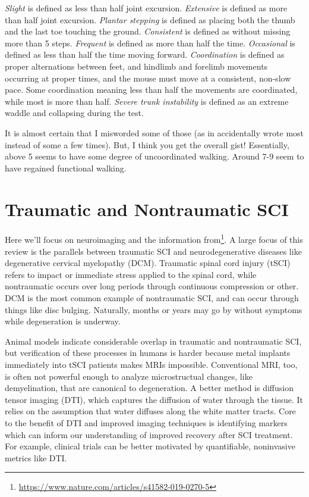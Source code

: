 \textit{Slight} is defined as less than half joint excursion. \textit{Extensive} is defined as more than half joint excursion. \textit{Plantar stepping} is defined as placing both the thumb and the last toe touching the ground. \textit{Consistent} is defined as without missing more than 5 steps. \textit{Frequent} is defined as more than half the time. \textit{Occasional} is defined as less than half the time moving forward. \textit{Coordination} is defined as proper alternations between feet, and hindlimb and forelimb movements occurring at proper times, and the mouse must move at a consistent, non-slow pace. Some coordination meaning less than half the movements are coordinated, while most is more than half. \textit{Severe trunk instability} is defined as an extreme waddle and collapsing during the test.\newline

It is almost certain that I misworded some of those (as in accidentally wrote most instead of some a few times). But, I think you get the overall gist! Essentially, above 5 seems to have some degree of uncoordinated walking. Around 7-9 seem to have regained functional walking. 


\section{Traumatic and Nontraumatic SCI}

\label{sec:TvsnonTSCI}

Here we'll focus on neuroimaging and the information from\footnote{\url{https://www.nature.com/articles/s41582-019-0270-5}}. A large focus of this review is the parallels between traumatic SCI and neurodegenerative diseases like degenerative cervical myelopathy (DCM). Traumatic spinal cord injury (tSCI) refers to impact or immediate stress applied to the spinal cord, while nontraumatic occurs over long periods through continuous compression or other. DCM is the most common example of nontraumatic SCI, and can occur through things like disc bulging. Naturally, months or years may go by without symptoms while degeneration is underway.\newline

Animal models indicate considerable overlap in traumatic and nontraumatic SCI, but verification of these processes in humans is harder because metal implants immediately into tSCI patients makes MRIs impossible. Conventional MRI, too, is often not powerful enough to analyze microstructual changes, like demyelination, that are canonical to degeneration. A better method is diffusion tensor imaging (DTI), which captures the diffusion of water through the tissue. It relies on the assumption that water diffuses along the white matter tracts. Core to the benefit of DTI and improved imaging techniques is identifying markers which can inform our understanding of improved recovery after SCI treatment. For example, clinical trials can be better motivated by quantifiable, noninvasive metrics like DTI. 

